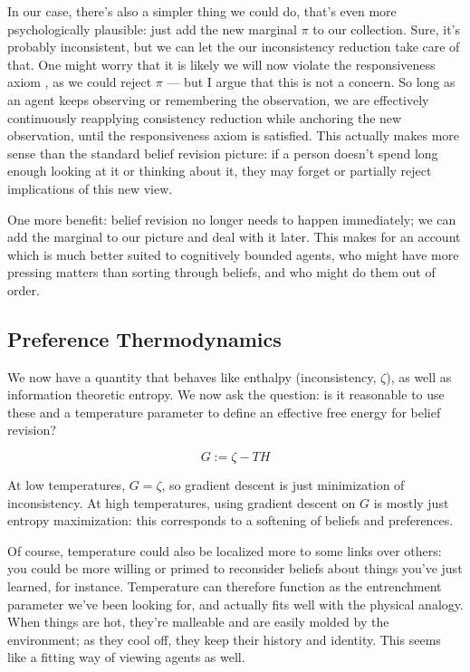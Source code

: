 \documentclass{article}
\begin{document}
	In our case, there's also a simpler thing we could do, that's even more psychologically plausible: just add the new marginal $\pi$ to our collection. Sure, it's probably inconsistent, but we can let the our inconsistency reduction take care of that. One might worry that it is likely we will now violate the responsiveness axiom \cite{dietrich2016belief}, as we could reject $\pi$ --- but I argue that this is not a concern. So long as an agent keeps observing or remembering the observation, we are effectively continuously reapplying consistency reduction while anchoring the new observation, until the responsiveness axiom is satisfied. This actually makes more sense than the standard belief revision picture: if a person doesn't spend long enough looking at it or thinking about it, they may forget or partially reject implications of this new view.
	
	
	One more benefit: belief revision no longer needs to happen immediately; we can add the marginal to our picture and deal with it later. This makes for an account which is much better suited to cognitively bounded agents, who might have more pressing matters than sorting through beliefs, and who might do them out of order.
	
	\subsection{Preference Thermodynamics} \label{sec:thermo}
	We now have a quantity that behaves like enthalpy (inconsistency, $\zeta$), as well as information theoretic entropy. We now ask the question: is it reasonable to use these and a temperature parameter to define an effective free energy for belief revision?
	
	\[ G := \zeta - T H \]
	

	At low temperatures, $G = \zeta$, so gradient descent is just minimization of inconsistency. At high temperatures, using gradient descent on $G$ is mostly just entropy maximization: this corresponds to a softening of beliefs and preferences. 
	
	Of course, temperature could also be localized more to some links over others: you could be more willing or primed to reconsider beliefs about things you've just learned, for instance. Temperature can therefore function as the entrenchment parameter we've been looking for, and actually fits well with the physical analogy. When things are hot, they're malleable and are easily molded by the environment; as they cool off, they keep their history and identity. This seems like a fitting way of viewing agents as well.
	
\end{document}
